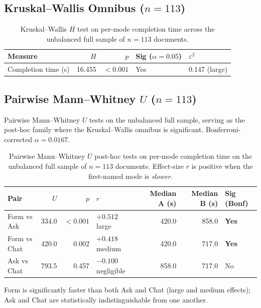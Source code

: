 \subsection{Kruskal--Wallis Omnibus ($n = 113$)}

\begin{table}[H]
\centering
\small
\begin{tabular}{@{}l r r l l@{}}
\toprule
Measure & $H$ & $p$ & Sig ($\alpha = 0.05$) & $\varepsilon^2$ \\
\midrule
Completion time (s) & 16.455 & $<0.001$ & Yes & 0.147 (large) \\
\bottomrule
\end{tabular}
\caption{Kruskal--Wallis $H$ test on per-mode completion time
across the unbalanced full sample of $n = 113$ documents.}
\label{tab:app-timing-kw}
\end{table}

\subsection{Pairwise Mann--Whitney $U$ ($n = 113$)}

Pairwise Mann--Whitney $U$ tests on the unbalanced full sample,
serving as the post-hoc family where the Kruskal--Wallis omnibus
is significant. Bonferroni-corrected $\alpha = 0.0167$.

\begin{table}[H]
\centering
\small
\setlength{\tabcolsep}{4pt}
\begin{tabular}{@{}l r r l r r l@{}}
\toprule
Pair & $U$ & $p$ & $r$ & Median A (s) & Median B (s) & Sig (Bonf) \\
\midrule
Form vs Ask  & 334.0 & $<0.001$ & $+0.512$ large       & 420.0 & 858.0 & \textbf{Yes} \\
Form vs Chat & 420.0 & 0.002    & $+0.418$ medium      & 420.0 & 717.0 & \textbf{Yes} \\
Ask vs Chat  & 793.5 & 0.457    & $-0.100$ negligible  & 858.0 & 717.0 & No \\
\bottomrule
\end{tabular}
\caption{Pairwise Mann--Whitney $U$ post-hoc tests on per-mode
completion time on the unbalanced full sample of $n = 113$
documents. Effect-size $r$ is positive when the first-named mode
is \emph{slower}.}
\label{tab:app-timing-mwu}
\end{table}

Form is significantly faster than both Ask and Chat (large and
medium effects); Ask and Chat are statistically indistinguishable
from one another.
